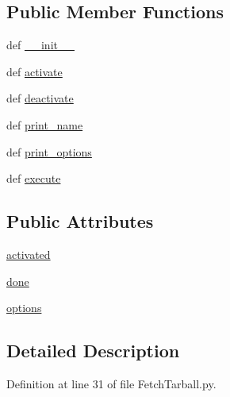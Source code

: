 \subsection*{Public Member Functions}
\begin{DoxyCompactItemize}
\item 
def \hyperlink{class_fetch_tarball_1_1_fetch_tarball_a0fb0f6decddbd019212beb941b1d8b33}{\-\_\-\-\_\-init\-\_\-\-\_\-}
\item 
def \hyperlink{class_fetch_tarball_1_1_fetch_tarball_a9a88f8be0e5f6c54247c3a85da711f38}{activate}
\item 
def \hyperlink{class_fetch_tarball_1_1_fetch_tarball_aba185f1c1adad0aea744fc418093ffcf}{deactivate}
\item 
def \hyperlink{class_fetch_tarball_1_1_fetch_tarball_afcac4e7b528550c345ffca891b0f32fa}{print\-\_\-name}
\item 
def \hyperlink{class_fetch_tarball_1_1_fetch_tarball_a750d4f069ce00c62d8e44d1e5dd47d08}{print\-\_\-options}
\item 
def \hyperlink{class_fetch_tarball_1_1_fetch_tarball_ad99192c36d2f7200799fa8a2a37c6a5a}{execute}
\end{DoxyCompactItemize}
\subsection*{Public Attributes}
\begin{DoxyCompactItemize}
\item 
\hyperlink{class_fetch_tarball_1_1_fetch_tarball_a4e6818fd64191913c3f302485c2c4e96}{activated}
\item 
\hyperlink{class_fetch_tarball_1_1_fetch_tarball_ae733fd553804854c3beef59df1739732}{done}
\item 
\hyperlink{class_fetch_tarball_1_1_fetch_tarball_ae5c7611a1ef415c3e38c75ea803ef2e3}{options}
\end{DoxyCompactItemize}


\subsection{Detailed Description}


Definition at line 31 of file Fetch\-Tarball.\-py.



